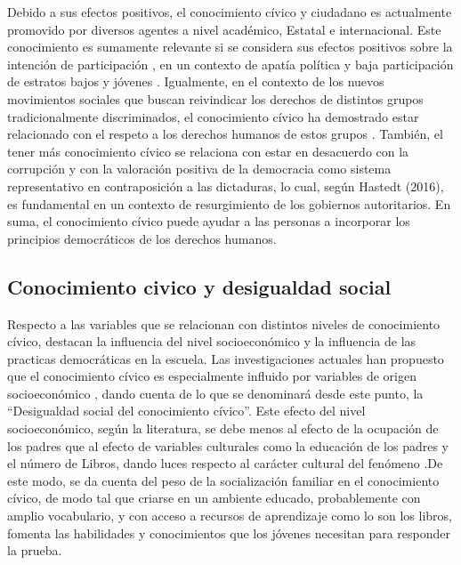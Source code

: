\documentclass[12pt,twoside]{templates/facsothesis}
\begin{document}
Debido a sus efectos positivos, el conocimiento cívico y ciudadano es actualmente promovido por diversos agentes a nivel académico, Estatal e internacional. Este conocimiento es sumamente relevante si se considera sus efectos positivos sobre la intención de participación \citep{miranda_Desigualdad_2015}, en un contexto de apatía política y baja participación de estratos bajos y jóvenes \citep{janmaat_Civic_2013, contreras_DIFERENCIAS_2013}. Igualmente, en el contexto de los nuevos movimientos sociales que buscan reivindicar los derechos de distintos grupos tradicionalmente discriminados, el conocimiento cívico ha demostrado estar relacionado con el respeto a los derechos humanos de estos grupos \citep{miranda_Political_2018, caro_Ten_2012}. También, el tener más conocimiento cívico se relaciona con estar en desacuerdo con la corrupción y con la valoración positiva de la democracia como sistema representativo en contraposición a las dictaduras, lo cual, según Hastedt (2016), es fundamental en un contexto de resurgimiento de los gobiernos autoritarios. En suma, el conocimiento cívico puede ayudar a las personas a incorporar los principios democráticos de los derechos humanos.

\hypertarget{conocimiento-civico-y-desigualdad-social}{%
\subsection{Conocimiento civico y desigualdad social}\label{conocimiento-civico-y-desigualdad-social}}

Respecto a las variables que se relacionan con distintos niveles de conocimiento cívico, destacan la influencia del nivel socioeconómico y la influencia de las practicas democráticas en la escuela. Las investigaciones actuales han propuesto que el conocimiento cívico es especialmente influido por variables de origen socioeconómico \citep{ace_Estudio_2017, schulz_Estudio_2011, ferrans_Civic_2017, trevino_Influence_2017}, dando cuenta de lo que se denominará desde este punto, la ``Desigualdad social del conocimiento cívico''. Este efecto del nivel socioeconómico, según la literatura, se debe menos al efecto de la ocupación de los padres que al efecto de variables culturales como la educación de los padres y el número de Libros, dando luces respecto al carácter cultural del fenómeno \citep{castillo_Social_2014}.De este modo, se da cuenta del peso de la socialización familiar en el conocimiento cívico, de modo tal que criarse en un ambiente educado, probablemente con amplio vocabulario, y con acceso a recursos de aprendizaje como lo son los libros, fomenta las habilidades y conocimientos que los jóvenes necesitan para responder la prueba.
\end{document}
